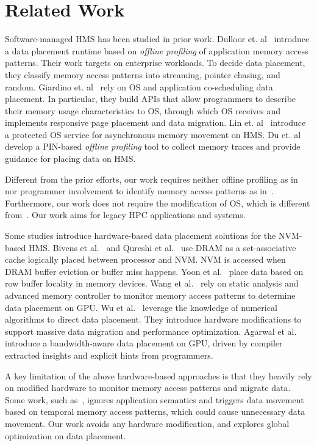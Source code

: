 \section{Related Work}
\label{sec:related_work}
\begin{spacing}{0.9}
Software-managed HMS has been studied in prior work.
Dulloor et. al~\cite{eurosys16:dulloor} introduce a data placement runtime
based on \textit{offline profiling} of application memory access patterns.
Their work targets on enterprise workloads. To decide data placement, they classify memory access patterns into streaming, pointer chasing, and random.
Giardino et. al~\cite{nas16:giardino} rely on OS and application co-scheduling
data placement. In particular, they build APIs that allow programmers
to describe their memory usage characteristics
to OS, through which OS receives and implements
responsive page placement and data migration.
Lin et. al~\cite{asplos16:lin} introduce
a protected OS service for asynchronous memory movement on HMS.
Du et. al~\cite{ismm16:shen} develop a PIN-based \textit{offline profiling} tool
to collect memory traces and provide guidance for placing data on HMS.

Different from the prior efforts, our work requires neither offline profiling as in~\cite{eurosys16:dulloor, ismm16:shen}
nor programmer involvement to identify memory access patterns as in~\cite{nas16:giardino}.
Furthermore, our work does not require the modification of OS, which is different from~\cite{asplos16:lin}.
Our work aims for legacy HPC applications and systems.

Some studies introduce hardware-based data placement solutions for the NVM-based HMS.
Bivens et al.~\cite{hetero_mem_arch} and Qureshi et al.~\cite{qureshi_micro09, ibm_isca09} use DRAM as a set-associative cache logically placed between processor and NVM.
NVM is accessed when DRAM buffer eviction or buffer miss happens. 
Yoon et al.~\cite{row_buffer_pcm_iccd12} place data based on row buffer locality in memory devices.
Wang et al.~\cite{gpu_pcm_pact13} rely on static analysis and advanced memory controller to monitor memory access patterns %
to determine data placement on GPU.
Wu et al.~\cite{hpdc16:wu} leverage the knowledge of numerical algorithms to direct data placement. They introduce hardware modifications to support massive data migration and performance optimization. 
Agarwal et al.~\cite{asplos15:agarwal} introduce a bandwidth-aware data placement on GPU, driven by compiler extracted insights and explicit hints from programmers.

A key limitation of the above hardware-based approaches is that they heavily rely on modified hardware to monitor memory access patterns and migrate data.
Some work, such as~\cite{qureshi_micro09, ibm_isca09, gpu_pcm_pact13, row_buffer_pcm_iccd12},
ignores application semantics and triggers data movement based on temporal memory access patterns,
which could cause unnecessary data movement.
Our work avoids any hardware modification,
and explores global optimization on data placement.
\vspace{-15pt}
\end{spacing}

